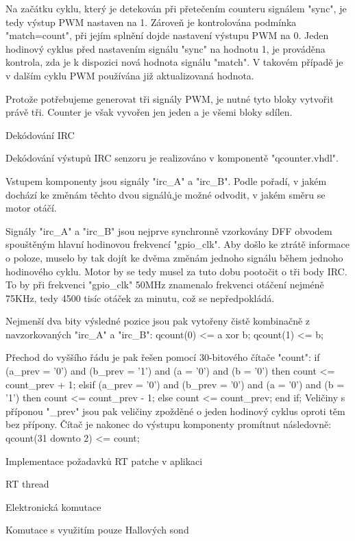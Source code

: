 Na začátku cyklu, který je detekován při přetečením counteru signálem "sync", je tedy výstup PWM nastaven na 1. Zároveň je kontrolována podmínka "match=count", při jejím splnění dojde nastavení výstupu PWM na 0. Jeden hodinový cyklus před nastavením signálu "sync" na hodnotu 1, je prováděna kontrola, zda je k dispozici nová hodnota signálu "match". V takovém případě je v dalším cyklu PWM používána již aktualizovaná hodnota. 

Protože potřebujeme generovat tři signály PWM, je nutné tyto bloky vytvořit právě tři. Counter je však vyvořen jen jeden a je všemi bloky sdílen.  


\sec Dekódování IRC

Dekódování výstupů IRC senzoru je realizováno v komponentě "qcounter.vhdl". 

Vstupem komponenty jsou signály "irc_A" a "irc_B". Podle pořadí, v jakém dochází ke změnám těchto dvou signálů,je možné odvodit, v jakém směru se motor otáčí.

Signály "irc_A" a "irc_B" jsou nejprve synchronně vzorkovány DFF obvodem spouštěným hlavní hodinovou frekvencí "gpio_clk". Aby došlo ke ztrátě informace o poloze, muselo by tak dojít ke dvěma změnám jednoho signálu během jednoho hodinového cyklu. Motor by se tedy musel za tuto dobu pootočit o tři body IRC. To by při frekvenci "gpio_clk" 50MHz znamenalo frekvenci otáčení  nejméně 75KHz, tedy 4500 tisíc otáček za minutu, což se nepředpokládá.

Nejmenší dva bity výsledné pozice jsou pak vytořeny čistě kombinačně z navzorkovaných "irc_A" a "irc_B":
  \begtt
  qcount(0) <= a xor b;
  qcount(1) <= b;\endtt
 
Přechod do vyššího řádu je pak řešen pomocí 30-bitového čítače "count":
\begtt
	if (a_prev = '0') and (b_prev = '1') and (a = '0') and (b = '0') then 
			count <= count_prev + 1;
		elsif (a_prev = '0') and (b_prev = '0') and (a = '0') and (b = '1') then 
			count <= count_prev - 1;
		else
			count <= count_prev;
		end if;\endtt
Veličiny s příponou "_prev" jsou pak veličiny zpožděné o jeden hodinový cyklus oproti těm bez přípony. Čítač je nakonec do výstupu komponenty promítnut následovně:
\begtt
  qcount(31 downto 2) <= count;\endtt


\sec Implementace požadavků RT patche v aplikaci 

\secc RT thread

\sec Elektronická komutace

\secc Komutace s využitím pouze Hallových sond

